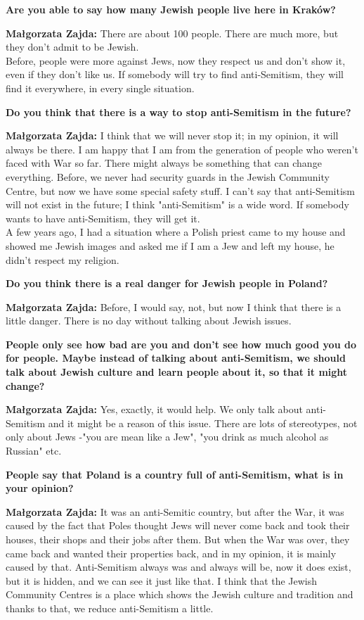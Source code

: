 \textbf{Are you able to say how many Jewish people live here in Kraków?} 

\textbf{Małgorzata Zajda:} There are about 100 people. There are much more, but they don't admit to be Jewish.\\ 
Before, people were more against Jews, now they respect us and don't show it, even if they don't like us. If somebody will try to find anti-Semitism, they will find it everywhere, in every single situation. 

\textbf{Do you think that there is a way to stop anti-Semitism in the future?} 

\textbf{Małgorzata Zajda:} I think that we will never stop it; in my opinion, it will always be there. I am happy that I am from the generation of people who weren’t faced with War so far. There might always be something that can change everything. Before, we never had security guards in the Jewish Community Centre, but now we have some special safety stuff. I can't say that anti-Semitism will not exist in the future; I think "anti-Semitism" is a wide word. If somebody wants to have anti-Semitism, they will get it.\\ 
A few years ago, I had a situation where a Polish priest came to my house and showed me Jewish images and asked me if I am a Jew and left my house, he didn't respect my religion.  

\textbf{Do you think there is a real danger for Jewish people in Poland?}  

\textbf{Małgorzata Zajda:} Before, I would say, not, but now I think that there is a little danger. There is no day without talking about Jewish issues.  

\textbf{People only see how bad are you and don't see how much good you do for people. Maybe instead of talking about anti-Semitism, we should talk about Jewish culture and learn people about it, so that it might change?} 

\textbf{Małgorzata Zajda:} Yes, exactly, it would help. We only talk about anti-Semitism and it might be a reason of this issue.  
There are lots of stereotypes, not only about Jews -"you are mean like a Jew", "you drink as much alcohol as Russian" etc.  

\textbf{People say that Poland is a country full of anti-Semitism, what is in your opinion?} 

\textbf{Małgorzata Zajda:} It was an anti-Semitic country, but after the War, it was caused by the fact that Poles thought Jews will never come back and took their houses, their shops and their jobs after them. But when the War was over, they came back and wanted their properties back, and in my opinion, it is mainly caused by that. Anti-Semitism always was and always will be, now it does exist, but it is hidden, and we can see it just like that.  
I think that the Jewish Community Centres is a place which shows the Jewish culture and tradition and thanks to that, we reduce anti-Semitism a little.  


